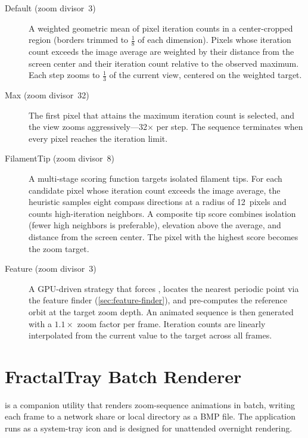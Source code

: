 \begin{description}
  \item[Default (zoom divisor~3)]
    A weighted geometric mean of pixel iteration counts in a
    center-cropped region (borders trimmed to $\tfrac{1}{8}$ of each
    dimension).  Pixels whose iteration count exceeds the image average
    are weighted by their distance from the screen center and their
    iteration count relative to the observed maximum.  Each step zooms
    to $\tfrac{1}{3}$ of the current view, centered on the weighted
    target.

  \item[Max (zoom divisor~32)]
    The first pixel that attains the maximum iteration count is selected,
    and the view zooms aggressively---32$\times$ per step.  The sequence
    terminates when every pixel reaches the iteration limit.

  \item[FilamentTip (zoom divisor~8)]
    A multi-stage scoring function targets isolated filament tips.  For
    each candidate pixel whose iteration count exceeds the image
    average, the heuristic samples eight compass directions at a radius
    of 12~pixels and counts high-iteration neighbors.  A composite
    tip score combines isolation (fewer high neighbors is preferable),
    elevation above the average, and distance from the screen center.
    The pixel with the highest score becomes the zoom target.

  \item[Feature (zoom divisor~3)]
    A GPU-driven strategy that forces ,
    locates the nearest periodic point via the feature finder
    (\cref{sec:feature-finder}), and pre-computes the reference orbit
    at the target zoom depth.  An animated sequence is then generated
    with a $1.1\times$ zoom factor per frame.  Iteration counts are
    linearly interpolated from the current value to the target across
    all frames.
\end{description}

\section{FractalTray Batch Renderer}
\label{subsec:fractaltray}

 is a companion utility that renders zoom-sequence
animations in batch, writing each frame to a network share or local
directory as a BMP file.  The application runs as a system-tray icon
and is designed for unattended overnight rendering.

